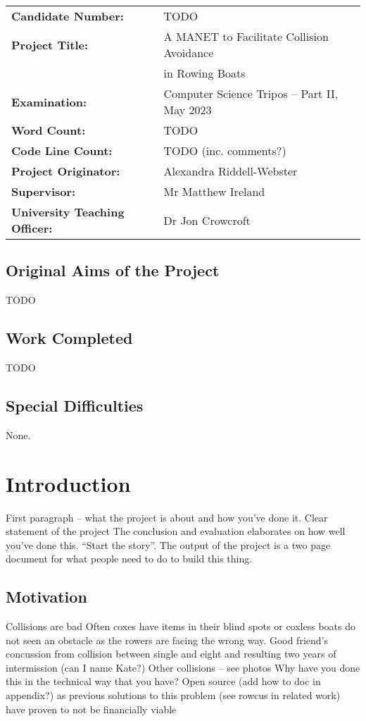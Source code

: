 \documentclass[12pt,a4paper]{report}
\newcommand{\newchapter}[2]{
    \setcounter{chapter}{#1}
    \setcounter{section}{0}
    \chapter*{#2}
    \addcontentsline{toc}{chapter}{#1 #2}
}
\begin{document}
{\large
\begin{tabular}{ll}
\bf Candidate Number:   & TODO \\
\bf Project Title:  & A MANET to Facilitate Collision Avoidance \\
& in Rowing Boats \\
\bf Examination:  & Computer Science Tripos -- Part II, May 2023      \\
\bf Word Count:    & TODO \footnotemark[1]   \\
\bf Code Line Count:    & TODO (inc. comments?) \\
\bf Project Originator: & Alexandra Riddell-Webster                 \\
\bf Supervisor:         & Mr Matthew Ireland  \\ 
\bf University Teaching Officer:  & Dr Jon Crowcroft \\ 
\end{tabular}
}


\section*{Original Aims of the Project}
TODO

\section*{Work Completed}
TODO

\section*{Special Difficulties}
None.


\newpage
\tableofcontents


\newchapter{1}{Introduction}
First paragraph -- what the project is about and how you've done it. Clear statement of the project The conclusion and evaluation elaborates on how well you've done this. 
``Start the story''. The output of the project is a two page document for what people need to do to build this thing. 

\section{Motivation}	
Collisions are bad
Often coxes have items in their blind spots or coxless boats do not seen an obstacle as the rowers are facing the wrong way.
Good friend's concussion from collision between single and eight and resulting two years of intermission (can I name Kate?)
Other collisions -- see photos
Why have you done this in the technical way that you have?
Open source (add how to doc in appendix?) as previous solutions to this problem (see rowcus in related work) have proven to not be financially viable
\end{document}

